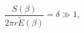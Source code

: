 \begin{equation}
\frac{S\left(\beta \right)}{2\pi r\widetilde{E}\left(\beta \right)}=\delta \gg 1,\end{equation}


